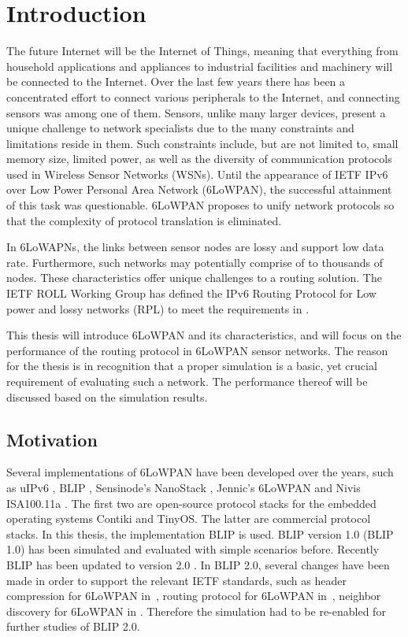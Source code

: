 \chapter{Introduction}
\label{1.0 Intr}

The future Internet will be the Internet of Things, meaning that everything from household applications and appliances to industrial facilities and machinery will be connected to the Internet. Over the last few years there has been a concentrated effort to connect various peripherals to the Internet, and connecting sensors was among one of them. Sensors, unlike many larger devices, present a unique challenge to network specialists due to the many constraints and limitations reside in them. Such constraints include, but are not limited to, small memory size, limited power, as well as the diversity of communication protocols used in Wireless Sensor Networks (WSNs)\@. Until the appearance of IETF IPv6 over Low Power Personal Area Network (6LoWPAN)\@, the successful attainment of this task was questionable. 6LoWPAN proposes to unify network protocols so that the complexity of protocol translation is eliminated. 

In 6LoWAPNs, the links between sensor nodes are lossy and support low data rate. Furthermore, such networks may potentially comprise of to thousands of nodes. These characteristics offer unique challenges to a routing solution. The IETF ROLL Working Group has defined the IPv6 Routing Protocol for Low power and lossy networks (RPL) to meet the requirements in \cite{draft-ietf-roll-rpl-19}.

This thesis will introduce 6LoWPAN and its characteristics, and will focus on the performance of the routing protocol in 6LoWPAN sensor networks. The reason for the thesis is in recognition that a proper simulation is a basic, yet crucial requirement of evaluating such a network. The performance thereof will be discussed based on the simulation results.

\section{Motivation}
\label{Intr:Motiv}

Several implementations of 6LoWPAN have been developed over the years, such as uIPv6 \cite{uIPv6}, BLIP \cite{BLIP}, Sensinode's NanoStack \cite{Sensinode}, Jennic's 6LoWPAN \cite{Jennic} and Nivis ISA100.11a \cite{Nivis}. The first two are open-source protocol stacks for the embedded operating systems Contiki and TinyOS. The latter are commercial protocol stacks. In this thesis, the implementation BLIP is used. BLIP version 1.0 (BLIP 1.0) has been simulated and evaluated with simple scenarios before. Recently BLIP has been updated to version 2.0 \cite{BLIP2.0}\@. In BLIP 2.0, several changes have been made in order to support the relevant IETF standards, such as header compression for 6LoWPAN in~\cite{draft-ietf-6lowpan-hc-15}, routing protocol for 6LoWPAN in~\cite{draft-ietf-roll-rpl-19}, neighbor discovery for 6LoWPAN in \cite{draft-ietf-6lowpan-nd-17}. 
Therefore the simulation had to be re-enabled for further studies of BLIP 2.0. 

